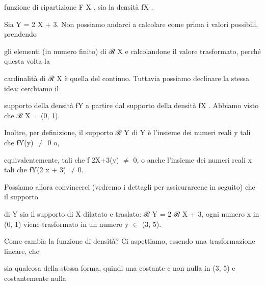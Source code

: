 \documentclass[a4paper,portrait,12pt]{article}
\begin{document}
\begin{flushleft}
funzione di ripartizione F X , sia la densit\`{a} fX .
\end{flushleft}


\begin{flushleft}
Sia Y = 2 X + 3. Non possiamo andarci a calcolare come prima i valori possibili, prendendo
\end{flushleft}


\begin{flushleft}
gli elementi (in numero finito) di ℛ X e calcolandone il valore trasformato, perch\'{e} questa volta la
\end{flushleft}


\begin{flushleft}
cardinalit\`{a} di ℛ X \`{e} quella del continuo. Tuttavia possiamo declinare la stessa idea: cerchiamo il
\end{flushleft}


\begin{flushleft}
supporto della densit\`{a} fY a partire dal supporto della densit\`{a} fX . Abbiamo visto che ℛ X = (0, 1).
\end{flushleft}


\begin{flushleft}
Inoltre, per definizione, il supporto ℛ Y di Y \`{e} l'insieme dei numeri reali y tali che fY(y) $\neq$ 0 o,
\end{flushleft}


\begin{flushleft}
equivalentemente, tali che f 2X+3(y) $\neq$ 0, o anche l'insieme dei numeri reali x tali che fY(2 x + 3) $\neq$0.
\end{flushleft}


\begin{flushleft}
Possiamo allora convincerci (vedremo i dettagli per assicurarcene in seguito) che il supporto
\end{flushleft}


\begin{flushleft}
di Y sia il supporto di X dilatato e traslato: ℛ Y = 2 ℛ X + 3, ogni numero x in (0, 1) viene trasformato in un numero y $\in$ (3, 5).
\end{flushleft}


\begin{flushleft}
Come cambia la funzione di densit\`{a}? Ci aspettiamo, essendo una trasformazione lineare, che
\end{flushleft}


\begin{flushleft}
sia qualcosa della stessa forma, quindi una costante c non nulla in (3, 5) e costantemente nulla
\end{flushleft}
\end{document}
